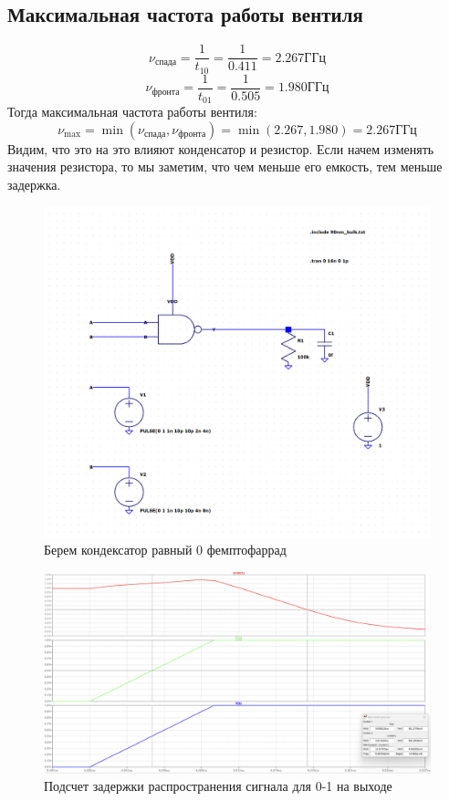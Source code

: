 \documentclass[12pt,onecolumn]{article}
\begin{document}
\subsection{Максимальная частота работы вентиля}
$$
    \nu_{\text{спада}} = \frac{1}{t_{10}} = \frac{1}{0.411} = 2.267 \text{ГГц}
$$
$$
    \nu_{\text{фронта}} = \frac{1}{t_{01}} = \frac{1}{0.505} = 1.980 \text{ГГц}
$$
Тогда максимальная частота работы вентиля:
$$
\nu_{\max} = \min(\nu_{\text{спада}}, \nu_{\text{фронта}}) = \min(2.267, 1.980 ) = 2.267 \text{ГГц}
$$
Видим, что это на это влияют конденсатор и резистор. Если начем изменять значения резистора, то мы заметим, что чем меньше его емкость, тем меньше задержка.
\begin{figure}[H]
    \centering
    \includegraphics[width=\textwidth]{image/schema-1.png}
    \caption{Берем кондексатор равный 0 фемптофаррад }
\end{figure}
\begin{figure}[H]
    \centering
    \includegraphics[width=\textwidth]{image/fall.png}
    \caption{Подсчет задержки распространения сигнала для 0-1 на выходе}
\end{figure}
\end{document}
